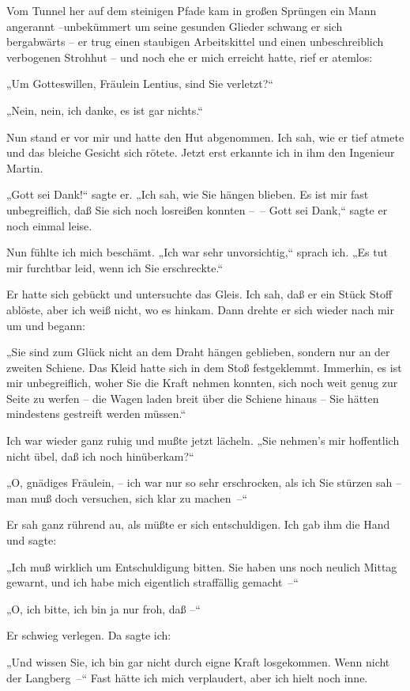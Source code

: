 Vom Tunnel her auf dem steinigen Pfade kam in großen Sprüngen ein
Mann angerannt –unbekümmert um seine gesunden Glieder schwang er
sich bergabwärts – er trug einen staubigen Arbeitskittel und einen
unbeschreiblich verbogenen Strohhut – und noch ehe er mich erreicht
hatte, rief er atemlos:

„Um Gotteswillen, Fräulein Lentius, sind Sie verletzt?“

„Nein, nein, ich danke, es ist gar nichts.“

Nun stand er vor mir und hatte den Hut abgenommen. Ich sah, wie er
tief atmete und das bleiche Gesicht sich rötete. Jetzt erst
erkannte ich in ihm den Ingenieur Martin.

„Gott sei Dank!“ sagte er. „Ich sah, wie Sie hängen blieben. Es ist
mir fast unbegreiflich, daß Sie sich noch losreißen konnten –~–
Gott sei Dank,“ sagte er noch einmal leise.

Nun fühlte ich mich beschämt. „Ich war sehr unvorsichtig,“ sprach
ich. „Es tut mir furchtbar leid, wenn ich Sie erschreckte.“

Er hatte sich gebückt und untersuchte das Gleis. Ich sah, daß er
ein Stück Stoff ablöste, aber ich weiß nicht, wo es hinkam. Dann
drehte er sich wieder nach mir um und begann:

„Sie sind zum Glück nicht an dem Draht hängen geblieben, sondern
nur an der zweiten Schiene. Das Kleid hatte sich in dem Stoß
festgeklemmt. Immerhin, es ist mir unbegreiflich, woher Sie die
Kraft nehmen konnten, sich noch weit genug zur Seite zu werfen –
die Wagen laden breit über die Schiene hinaus – Sie hätten
mindestens gestreift werden müssen.“

Ich war wieder ganz ruhig und mußte jetzt lächeln. „Sie nehmen's
mir hoffentlich nicht übel, daß ich noch hinüberkam?“

„O, gnädiges Fräulein, – ich war nur so sehr erschrocken, als ich
Sie stürzen sah – man muß doch versuchen, sich klar zu machen~–“

Er sah ganz rührend au, als müßte er sich entschuldigen. Ich gab
ihm die Hand und sagte:

„Ich muß wirklich um Entschuldigung bitten. Sie haben uns noch
neulich Mittag gewarnt, und ich habe mich eigentlich straffällig
gemacht~–“

„O, ich bitte, ich bin ja nur froh, daß –“

Er schwieg verlegen. Da sagte ich:

„Und wissen Sie, ich bin gar nicht durch eigne Kraft losgekommen.
Wenn nicht der Langberg~–“ Fast hätte ich mich verplaudert, aber
ich hielt noch inne.

